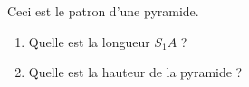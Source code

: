 
\begin{mental}
    Ceci est le patron d'une pyramide.

\begin{center}
   
\end{center}                                                                                                                                                 

\begin{enumerate}
    \item
        Quelle est la longueur \( S_1A\) ?
    \item
        Quelle est la hauteur de la pyramide ?
\end{enumerate}

\end{mental}
